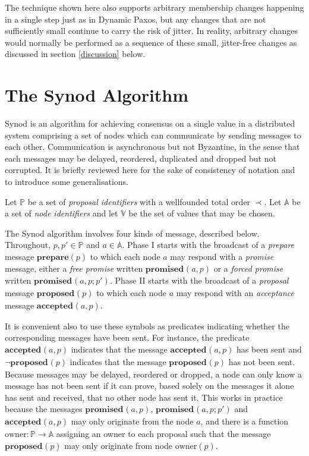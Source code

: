 \documentclass[journal]{IEEEtran}
\begin{document}
The technique shown here also supports arbitrary membership changes happening
in a single step just as in Dynamic Paxos, but any changes that are not
sufficiently small continue to carry the risk of jitter. In reality, arbitrary
changes would normally be performed as a sequence of these small, jitter-free
changes as discussed in section \ref{discussion} below.

\section{The Synod Algorithm}

Synod\cite{part-time-parliament} is an algorithm for achieving consensus on a
single value in a distributed system comprising a set of nodes which can
communicate by sending messages to each other. Communication is asynchronous
but not Byzantine, in the sense that each messages may be delayed, reordered,
duplicated and dropped but not corrupted. It is briefly reviewed here for the
sake of consistency of notation and to introduce some generalisations.

Let $\mathbb P$ be a set of \textit{proposal identifiers} with a wellfounded
total order $\prec$. Let $\mathbb A$ be a set of \textit{node identifiers} and
let $\mathbb V$ be the set of values that may be chosen.

\def\prep#1{\mathbf{prepare}(#1)}
\def\mprom#1#2#3{\mathbf{promised}_{\ge #1}(#2,#3)}
\def\fprom#1#2#3{\mathbf{promised}_{#1}(#2,#3)}
\def\bprom#1#2#3#4{\mathbf{promised}_{#1}(#2,#3;#4)}
\def\prop#1#2{\mathbf{proposed}_{#1}(#2)}
\def\acc#1#2#3{\mathbf{accepted}_{#1}(#2,#3)}
\def\chosen#1#2{\mathbf{chosen}_{#1}(#2)}
\def\owner#1{\mathrm{owner}(#1)}

The Synod algorithm involves four kinds of message, described below.
Throughout, $p, p' \in \mathbb P$ and $a \in \mathbb A$.  Phase I starts with
the broadcast of a \textit{prepare} message $\prep{p}$ to which each node $a$
may respond with a \textit{promise} message, either a \textit{free promise}
written $\fprom{}{a}{p}$ or a \textit{forced promise} written
$\bprom{}{a}{p}{p'}$.  Phase II starts with the broadcast of a
\textit{proposal} message $\prop{}{p}$ to which each node $a$ may respond with
an \textit{acceptance} message $\acc{}{a}{p}$.

It is convenient also to use these symbols as predicates indicating whether the
corresponding messages have been sent. For instance, the predicate
$\acc{}{a}{p}$ indicates that the message $\acc{}{a}{p}$ has been sent and
$\neg \prop{}{p}$ indicates that the message $\prop{}{p}$ has not been sent.
Because messages may be delayed, reordered or dropped, a node can only know a
message has not been sent if it can prove, based solely on the messages it
alone has sent and received, that no other node has sent it. This works in
practice because the messages $\fprom{}{a}{p}$, $\bprom{}{a}{p}{p'}$ and
$\acc{}{a}{p}$ may only originate from the node $a$, and there is a function
$\mathrm{owner} : \mathbb P \to \mathbb A$ assigning an owner to each proposal
such that the message $\prop{}{p}$ may only originate from node $\owner{p}$.
\end{document}
